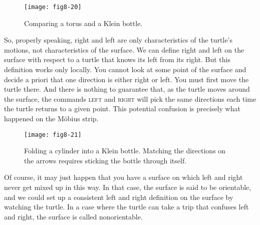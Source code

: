 \documentclass{book}
\begin{document}
\begin{figure}
\begin{center}
\texttt{[image: fig8-20]}
\caption{Comparing a torus and a Klein bottle.}
\end{center}
\end{figure}

So, properly speaking, right and left are only characteristics of the
turtle's motions, not characteristics of the surface. We can define right
and left on the surface with respect to a turtle that knows its left from
its right. But this definition works only locally. You cannot look at some
point of the surface and decide a priori that one direction is either right
or left. You must first move the turtle there. And there is nothing to
guarantee that, as the turtle moves around the surface, the commands
\textsc{left} and \textsc{right} will pick the same directions each time the turtle returns
to a given point. This potential confusion is precisely what happened on
the M\"obius strip.

\begin{figure}
\begin{center}
\texttt{[image: fig8-21]}
\caption{Folding a cylinder into a Klein bottle. Matching the directions on the arrows requires sticking the bottle through itself.}
\end{center}
\end{figure}

Of course, it may just happen that you have a surface on which left
and right never get mixed up in this way. In that case, the surface is
said to be orientable, and we could set up a consistent left and right
definition on the surface by watching the turtle. In a case where the
turtle can take a trip that confuses left and right, the surface is called
nonorientable.
\end{document}
